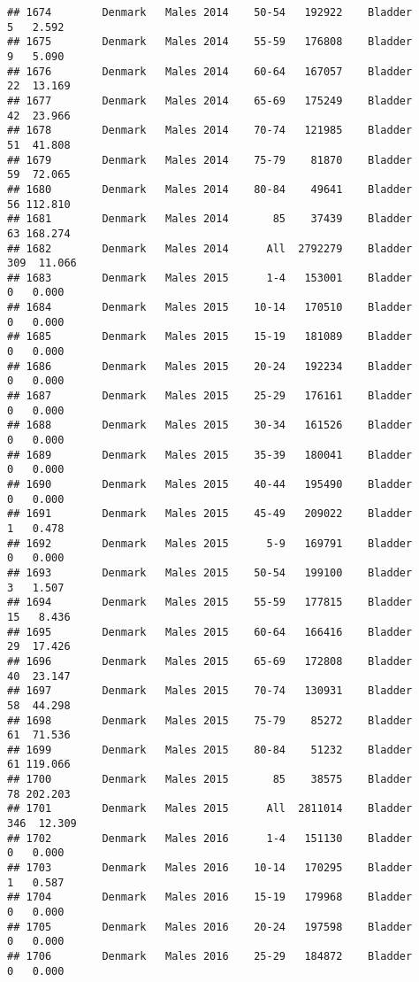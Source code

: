 \documentclass[
]{article}
\begin{document}
\begin{verbatim}
## 1674        Denmark   Males 2014    50-54   192922    Bladder      5   2.592
## 1675        Denmark   Males 2014    55-59   176808    Bladder      9   5.090
## 1676        Denmark   Males 2014    60-64   167057    Bladder     22  13.169
## 1677        Denmark   Males 2014    65-69   175249    Bladder     42  23.966
## 1678        Denmark   Males 2014    70-74   121985    Bladder     51  41.808
## 1679        Denmark   Males 2014    75-79    81870    Bladder     59  72.065
## 1680        Denmark   Males 2014    80-84    49641    Bladder     56 112.810
## 1681        Denmark   Males 2014       85    37439    Bladder     63 168.274
## 1682        Denmark   Males 2014      All  2792279    Bladder    309  11.066
## 1683        Denmark   Males 2015      1-4   153001    Bladder      0   0.000
## 1684        Denmark   Males 2015    10-14   170510    Bladder      0   0.000
## 1685        Denmark   Males 2015    15-19   181089    Bladder      0   0.000
## 1686        Denmark   Males 2015    20-24   192234    Bladder      0   0.000
## 1687        Denmark   Males 2015    25-29   176161    Bladder      0   0.000
## 1688        Denmark   Males 2015    30-34   161526    Bladder      0   0.000
## 1689        Denmark   Males 2015    35-39   180041    Bladder      0   0.000
## 1690        Denmark   Males 2015    40-44   195490    Bladder      0   0.000
## 1691        Denmark   Males 2015    45-49   209022    Bladder      1   0.478
## 1692        Denmark   Males 2015      5-9   169791    Bladder      0   0.000
## 1693        Denmark   Males 2015    50-54   199100    Bladder      3   1.507
## 1694        Denmark   Males 2015    55-59   177815    Bladder     15   8.436
## 1695        Denmark   Males 2015    60-64   166416    Bladder     29  17.426
## 1696        Denmark   Males 2015    65-69   172808    Bladder     40  23.147
## 1697        Denmark   Males 2015    70-74   130931    Bladder     58  44.298
## 1698        Denmark   Males 2015    75-79    85272    Bladder     61  71.536
## 1699        Denmark   Males 2015    80-84    51232    Bladder     61 119.066
## 1700        Denmark   Males 2015       85    38575    Bladder     78 202.203
## 1701        Denmark   Males 2015      All  2811014    Bladder    346  12.309
## 1702        Denmark   Males 2016      1-4   151130    Bladder      0   0.000
## 1703        Denmark   Males 2016    10-14   170295    Bladder      1   0.587
## 1704        Denmark   Males 2016    15-19   179968    Bladder      0   0.000
## 1705        Denmark   Males 2016    20-24   197598    Bladder      0   0.000
## 1706        Denmark   Males 2016    25-29   184872    Bladder      0   0.000

\end{verbatim}
\end{document}
